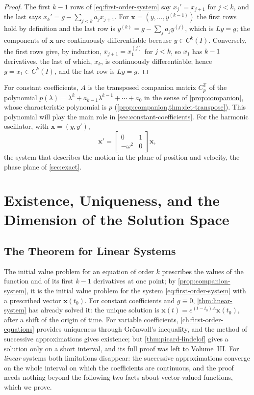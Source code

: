 \begin{proof}
The first $k-1$ rows of \eqref{eq:first-order-system} say $x_j'=x_{j+1}$ for $j<k$, and the last says $x_k'=g-\sum_{j<k}a_jx_{j+1}$. For $\mathbf x=(y,\ldots,y^{(k-1)})$ the first rows hold by definition and the last row is $y^{(k)}=g-\sum_ja_jy^{(j)}$, which is $Ly=g$; the components of $\mathbf x$ are continuously differentiable because $y\in C^k(I)$. Conversely, the first rows give, by induction, $x_{j+1}=x_1^{(j)}$ for $j<k$, so $x_1$ has $k-1$ derivatives, the last of which, $x_k$, is continuously differentiable; hence $y=x_1\in C^k(I)$, and the last row is $Ly=g$.
\end{proof}

For constant coefficients, $A$ is the transposed companion matrix $C_p^{\mathsf T}$ of the polynomial $p(\lambda)=\lambda^k+a_{k-1}\lambda^{k-1}+\cdots+a_0$ in the sense of \cref{prop:companion}, whose characteristic polynomial is $p$ (\cref{prop:companion,thm:det-transpose}). This polynomial will play the main role in \cref{sec:constant-coefficients}. For the harmonic oscillator, with $\mathbf x=(y,y')$,
\[
\mathbf x'=\begin{bmatrix}0&1\\-\omega^2&0\end{bmatrix}\mathbf x ,
\]
the system that describes the motion in the plane of position and velocity, the phase plane of \cref{sec:exact}.

\section{Existence, Uniqueness, and the Dimension of the Solution Space}
\label{sec:higher-existence}

\subsection{The Theorem for Linear Systems}

The initial value problem for an equation of order $k$ prescribes the values of the function and of its first $k-1$ derivatives at one point; by \cref{prop:companion-system}, it is the initial value problem for the system \eqref{eq:first-order-system} with a prescribed vector $\mathbf x(t_0)$. For constant coefficients and $g\equiv0$, \cref{thm:linear-system} has already solved it: the unique solution is $\mathbf x(t)=e^{(t-t_0)A}\mathbf x(t_0)$, after a shift of the origin of time. For variable coefficients, \cref{ch:first-order-equations} provides uniqueness through Gr\"onwall's inequality, and the method of successive approximations gives existence; but \cref{thm:picard-lindelof} gives a solution only on a short interval, and its full proof was left to Volume~III. For \emph{linear} systems both limitations disappear: the successive approximations converge on the whole interval on which the coefficients are continuous, and the proof needs nothing beyond the following two facts about vector-valued functions, which we prove.


